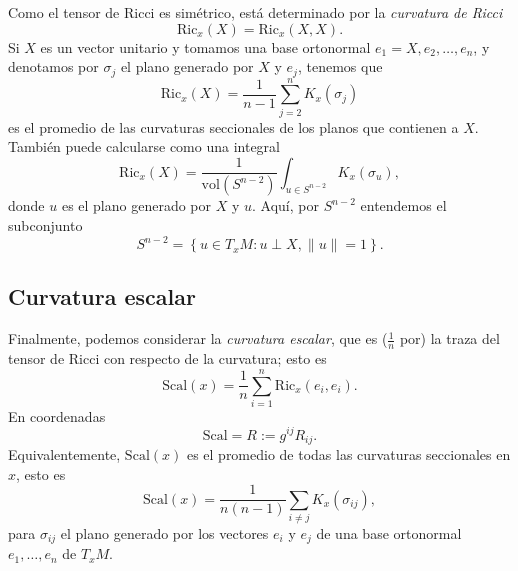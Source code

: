 \documentclass[11pt,a4paper]{amsbook}
\theoremstyle{remark} \newtheorem{rmk}[subsection]{Observación}
\theoremstyle{definition} \newtheorem{defn}[subsection]{Definición}
\theoremstyle{definition} \newtheorem{ex}[subsection]{Ejemplo}
\theoremstyle{definition} \newtheorem{ej}[subsection]{Ejercicio}
\begin{document}
Como el tensor de Ricci es simétrico, está determinado por la \emph{curvatura de Ricci}
\begin{equation*}
\mathrm{Ric}_x(X) = \mathrm{Ric}_x(X,X).
\end{equation*}
Si $X$ es un vector unitario y tomamos una base ortonormal $e_1=X,e_2,\dots,e_n$, y denotamos por $\sigma_{j}$ el plano generado por $X$ y $e_j$, tenemos que
\begin{equation*}
\mathrm{Ric}_x(X) = \frac{1}{n-1} \sum_{j=2}^n K_x(\sigma_j)
\end{equation*}
es el promedio de las curvaturas seccionales de los planos que contienen a $X$. También puede calcularse como una integral
\begin{equation*}
\mathrm{Ric}_x(X) = \frac{1}{\mathrm{vol}(S^{n-2})} \int_{u \in S^{n-2}} K_x(\sigma_u),
\end{equation*}
donde $u$ es el plano generado por $X$ y $u$. Aquí, por $S^{n-2}$ entendemos el subconjunto
\begin{equation*}
S^{n-2} = \left\{ u \in T_xM: u \perp X, \lVert u \rVert = 1 \right\}.
\end{equation*}

\subsection{Curvatura escalar} Finalmente, podemos considerar la \emph{curvatura escalar}, que es ($\tfrac{1}{n}$ por) la traza del tensor de Ricci con respecto de la curvatura; esto es
\begin{equation*}
\mathrm{Scal}(x) = \frac{1}{n} \sum_{i=1}^n \mathrm{Ric}_x(e_i,e_i).
\end{equation*}
 En coordenadas
\begin{equation*}
\mathrm{Scal} = R := g^{ij} R_{ij}.
\end{equation*}
Equivalentemente, $\mathrm{Scal}(x)$ es el promedio de todas las curvaturas seccionales en $x$, esto es
\begin{equation*}
\mathrm{Scal}(x) = \frac{1}{n(n-1)} \sum_{i\neq j} K_x(\sigma_{ij}),
\end{equation*}
para $\sigma_{ij}$ el plano generado por los vectores $e_i$ y $e_j$ de una base ortonormal $e_1,\dots,e_n$ de $T_xM$.
\end{document}
